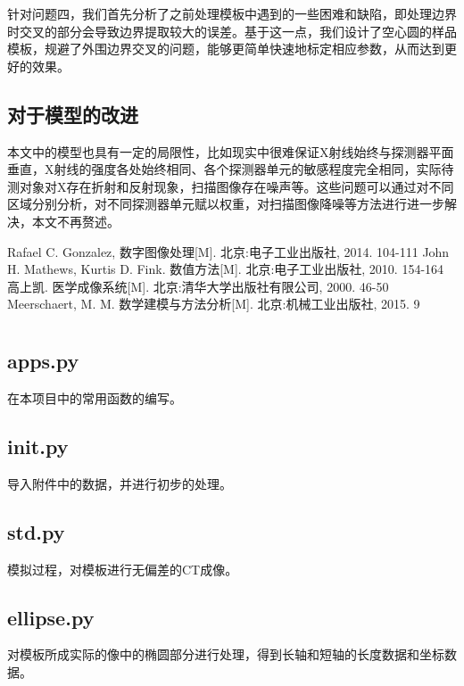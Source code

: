 \documentclass[withoutpreface,bwprint]{cumcmthesis} %
\begin{document}
    针对问题四，我们首先分析了之前处理模板中遇到的一些困难和缺陷，即处理边界时交叉的部分会导致边界提取较大的误差。基于这一点，我们设计了空心圆的样品模板，规避了外围边界交叉的问题，能够更简单快速地标定相应参数，从而达到更好的效果。


  \subsection{对于模型的改进}
  本文中的模型也具有一定的局限性，比如现实中很难保证X射线始终与探测器平面垂直，X射线的强度各处始终相同、各个探测器单元的敏感程度完全相同，实际待测对象对X存在折射和反射现象，扫描图像存在噪声等。这些问题可以通过对不同区域分别分析，对不同探测器单元赋以权重，对扫描图像降噪等方法进行进一步解决，本文不再赘述。


    \begin{thebibliography}{9}
      Rafael C. Gonzalez, 数字图像处理[M]. 北京:电子工业出版社, 2014. 104-111
      John H. Mathews, Kurtis D. Fink. 数值方法[M]. 北京:电子工业出版社, 2010. 154-164
      高上凯. 医学成像系统[M]. 北京:清华大学出版社有限公司, 2000. 46-50
      Meerschaert, M. M. 数学建模与方法分析[M]. 北京:机械工业出版社, 2015. 9
    \end{thebibliography}

    \newpage
    \appendix
\section{}
  \subsection{apps.py}
    在本项目中的常用函数的编写。
    
  \subsection{init.py}
    导入附件中的数据，并进行初步的处理。
    
  \subsection{std.py}
    模拟过程，对模板进行无偏差的CT成像。
    
  \subsection{ellipse.py}
    对模板所成实际的像中的椭圆部分进行处理，得到长轴和短轴的长度数据和坐标数据。
    
\end{document}
